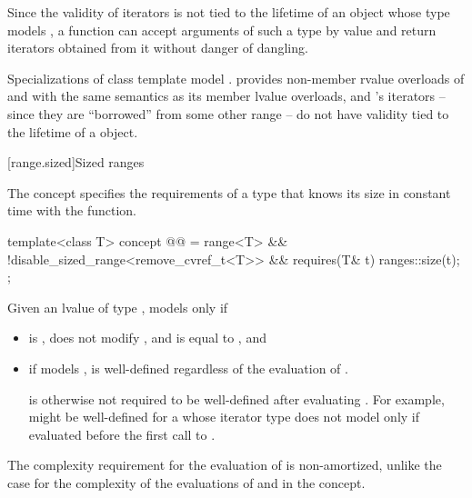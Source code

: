 \begin{itemdescr}
\pnum
\begin{note}
Since the validity of iterators is not tied to the lifetime of
an object whose type models ,
a function can accept arguments of such a type by value and
return iterators obtained from it without danger of dangling.
\end{note}

\pnum
\begin{example}
Specializations of class template 
model .  provides
non-member rvalue overloads of  and  with the same
semantics as its member lvalue overloads, and 's iterators
-- since they are ``borrowed'' from some other range --
do not have validity tied to the lifetime of a  object.
\end{example}
\end{itemdescr}

[range.sized]{Sized ranges}

\pnum
The  concept specifies the requirements
of a  type that knows its size in constant time with the
 function.

\begin{itemdecl}
template<class T>
  concept @@ =
    range<T> &&
    !disable_sized_range<remove_cvref_t<T>> &&
    requires(T& t) { ranges::size(t); };
\end{itemdecl}

\begin{itemdescr}
\pnum
Given an lvalue  of type , 
models  only if
\begin{itemize}
\item {} is , does not modify ,
and is equal to , and

\item if  models ,
 is well-defined regardless of the evaluation of
.
\begin{note}
 is otherwise not required to be
well-defined after evaluating .
For example,  might be well-defined
for a  whose iterator type
does not model 
only if evaluated before the first call to .
\end{note}
\end{itemize}

\pnum
\begin{note}
The complexity requirement for the evaluation of 
is non-amortized, unlike the case for the complexity of the evaluations of
 and  in the  concept.
\end{note}
\end{itemdescr}

